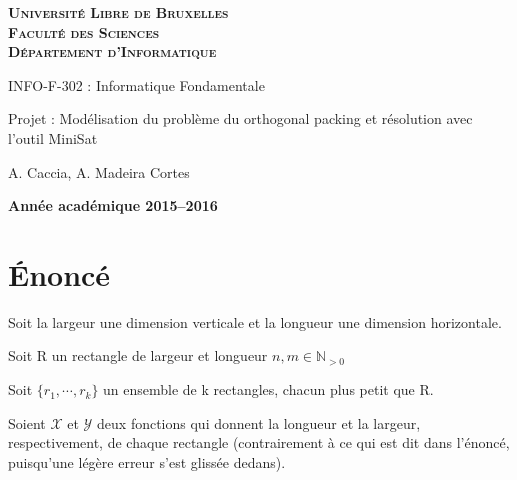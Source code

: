 \documentclass[a4paper,10pt]{article}
\begin{document}
\begin{titlepage}
    \begin{center}
        \textbf{\textsc{Université Libre de Bruxelles}}\\
        \textbf{\textsc{Faculté des Sciences}}\\
        \textbf{\textsc{Département d'Informatique}}

        \vfill{}
        \vfill{}

        \begin{center}
            {\Huge INFO-F-302 : Informatique Fondamentale}
        \end{center}

        {\Huge \par}

        \begin{center}
            {\LARGE Projet : Modélisation du problème du orthogonal packing et résolution avec l’outil MiniSat}
        \end{center}

        {\Huge \par}

        \begin{center}
            {\large A. Caccia, A. Madeira Cortes}
        \end{center}

        {\Huge \par}
        \vfill{}
        \vfill{}

        {\large\par}
        \vfill{}
        \vfill{}

        \textbf{Année académique 2015--2016}
    \end{center}
\end{titlepage}

\tableofcontents
\newpage

\section{Énoncé}

Soit la largeur une dimension verticale et la longueur une dimension horizontale.

Soit R un rectangle de largeur et longueur $n, m \in \mathbb{N}_{>0}$

Soit $\{r_1,\cdots,r_k\}$ un ensemble de k rectangles, chacun plus petit que R.

Soient $\mathcal{X}$ et $\mathcal{Y}$ deux fonctions qui donnent la longueur et la largeur, respectivement, de chaque rectangle (contrairement à ce qui est dit dans l'énoncé, puisqu'une légère erreur s'est glissée dedans).
\end{document}
